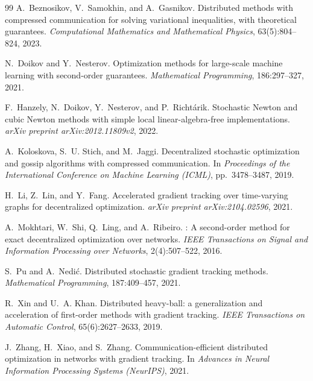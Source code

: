 \documentclass[11pt,a4paper]{article}
\begin{document}
\begin{thebibliography}{99}
		A.~Beznosikov, V.~Samokhin, and A.~Gasnikov.
		\newblock Distributed methods with compressed communication for solving variational inequalities, with theoretical guarantees.
		\newblock \emph{Computational Mathematics and Mathematical Physics}, 63(5):804--824, 2023.
		
		N.~Doikov and Y.~Nesterov.
		\newblock Optimization methods for large-scale machine learning with second-order guarantees.
		\newblock \emph{Mathematical Programming}, 186:297--327, 2021.
		
		F.~Hanzely, N.~Doikov, Y.~Nesterov, and P.~Richt{\'a}rik.
		\newblock Stochastic Newton and cubic Newton methods with simple local linear-algebra-free implementations.
		\newblock \emph{arXiv preprint arXiv:2012.11809v2}, 2022.
		
		A.~Koloskova, S.~U. Stich, and M.~Jaggi.
		\newblock Decentralized stochastic optimization and gossip algorithms with compressed communication.
		\newblock In \emph{Proceedings of the International Conference on Machine Learning (ICML)}, pp.~3478--3487, 2019.
		
		H.~Li, Z.~Lin, and Y.~Fang.
		\newblock Accelerated gradient tracking over time-varying graphs for decentralized optimization.
		\newblock \emph{arXiv preprint arXiv:2104.02596}, 2021.
		
		A.~Mokhtari, W.~Shi, Q.~Ling, and A.~Ribeiro.
		: A second-order method for exact decentralized optimization over networks.
		\newblock \emph{IEEE Transactions on Signal and Information Processing over Networks}, 2(4):507--522, 2016.
		
		S.~Pu and A.~Nedi{\'c}.
		\newblock Distributed stochastic gradient tracking methods.
		\newblock \emph{Mathematical Programming}, 187:409--457, 2021.
		
		R.~Xin and U.~A. Khan.
		\newblock Distributed heavy-ball: a generalization and acceleration of first-order methods with gradient tracking.
		\newblock \emph{IEEE Transactions on Automatic Control}, 65(6):2627--2633, 2019.
		
		J.~Zhang, H.~Xiao, and S.~Zhang.
		\newblock Communication-efficient distributed optimization in networks with gradient tracking.
		\newblock In \emph{Advances in Neural Information Processing Systems (NeurIPS)}, 2021.
		
	\end{thebibliography}
\end{document}
